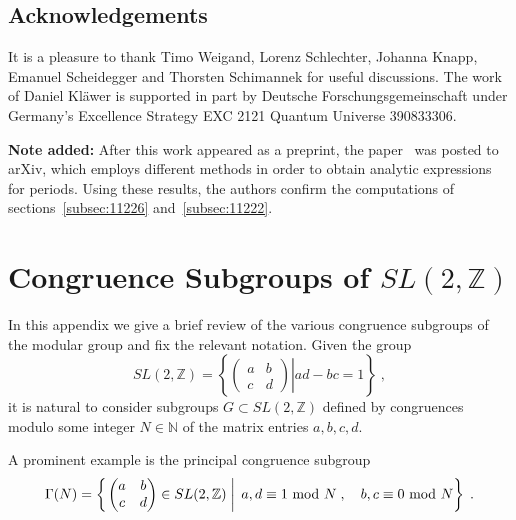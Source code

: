 \documentclass[11pt,a4paper]{article}
\numberwithin{equation}{section}
\numberwithin{table}{section}\setlength{\multlinegap}{25pt}
\begin{document}
\subsection*{Acknowledgements}
It is a pleasure to thank Timo Weigand, Lorenz Schlechter, Johanna Knapp, Emanuel Scheidegger and Thorsten Schimannek for useful discussions. The work of Daniel Kläwer is supported in part by Deutsche Forschungsgemeinschaft under Germany's Excellence Strategy EXC 2121 Quantum Universe 390833306.

{\bfseries Note added:} After this work appeared as a preprint, the paper~\cite{Alvarez-Garcia:2021mzv} was posted to arXiv, which employs different methods in order to obtain analytic expressions for periods. Using these results, the authors confirm the computations of sections~\ref{subsec:11226} and~\ref{subsec:11222}.

\appendix

\section{Congruence Subgroups of \texorpdfstring{$SL(2,\mathbb{Z})$}{SL(2,Z)}}
\label{app:CongruenceSubgroups}

In this appendix we give a brief review of the various congruence subgroups of the modular group and fix the relevant notation. Given the group
\begin{equation}
    SL(2,\mathbb{Z})=\left\{\left.\begin{pmatrix}a&b\\c&d\end{pmatrix}\right|ad-bc=1\right\}\;,
\end{equation}
it is natural to consider subgroups $G\subset SL(2,\mathbb{Z})$ defined by congruences modulo some integer $N\in\mathbb{N}$ of the matrix entries $a,b,c,d$.

A prominent example is the principal congruence subgroup
\begin{equation}
    \Gamma(N)=\left\{\left.\begin{pmatrix}a&b\\c&d\end{pmatrix}\in SL(2,\mathbb{Z})\;\right|\;a,d\equiv 1 \textup{ mod }N\;,\quad b,c\equiv 0\textup{ mod }N\right\}\;.
\end{equation}
\end{document}
